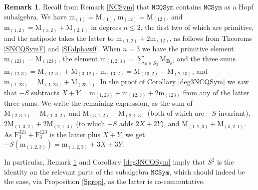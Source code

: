 \documentclass{article}
\theoremstyle{definition}
\newtheorem{rmk}[thm]{Remark}
\begin{document}
\begin{rmk}
Recall from Remark \ref{NCSym} that $\mathtt{NCQSym}$ contains $\mathtt{NCSym}$ as a Hopf subalgebra. We have $\mathrm{m}_{(1)}=\mathrm{M}_{(1)}$, $\mathrm{m}_{(12)}=\mathrm{M}_{(12)}$, and $\mathrm{m}_{(1,2)}=\mathrm{M}_{(1,2)}+\mathrm{M}_{(2,1)}$ in degrees $n\leq2$, the first two of which are primitive, and the antipode takes the latter to $\mathrm{m}_{(1,2)}+2\mathrm{m}_{(12)}$, as follows from Theorems \ref{SNCQSymF} and \ref{SFalphaw0}. When $n=3$ we have the primitive element $\mathrm{m}_{(123)}=\mathrm{M}_{(123)}$, the element $\mathrm{m}_{(1,2,3)}=\sum_{\rho \in S_{3}}\mathrm{M}_{\mathbf{B}_{\rho}}$, and the three sums $\mathrm{m}_{(12,3)}=\mathrm{M}_{(12,3)}+\mathrm{M}_{(3,12)}$, $\mathrm{m}_{(13,2)}=\mathrm{M}_{(13,2)}+\mathrm{M}_{(2,13)}$, and $\mathrm{m}_{(1,23)}=\mathrm{M}_{(1,23)}+\mathrm{M}_{(23,1)}$. In the proof of Corollary \ref{deg3NCQSym} we saw that $-S$ subtracts $X+Y=\mathrm{m}_{(1,23)}+\mathrm{m}_{(12,3)}+2\mathrm{m}_{(123)}$ from any of the latter three sums. We write the remaining expression, as the sum of $\mathrm{M}_{(2,3,1)}-\mathrm{M}_{(1,3,2)}$ and $\mathrm{M}_{(3,1,2)}-\mathrm{M}_{(2,1,3)}$ (both of which are $-S$-invariant), $2\mathrm{M}_{(1,3,2)}+2\mathrm{M}_{(2,1,3)}$ (to which $-S$ adds $2X+2Y$), and $\mathrm{M}_{(1,2,3)}+\mathrm{M}_{(3,2,1)}$. As $\mathrm{F}_{3}^{321}+\mathrm{F}_{3}^{123}$ is the latter plus $X+Y$, we get $-S(\mathrm{m}_{(1,2,3)})=\mathrm{m}_{(1,2,3)}+3X+3Y$. \label{NCSymS}
\end{rmk}
In particular, Remark \ref{NCSymS} and Corollary \ref{deg3NCQSym} imply that $S^{2}$ is the identity on the relevant parts of the subalgebra $\mathtt{NCSym}$, which should indeed be the case, via Proposition \ref{Sprop}, as the latter is co-commutative.
\end{document}
